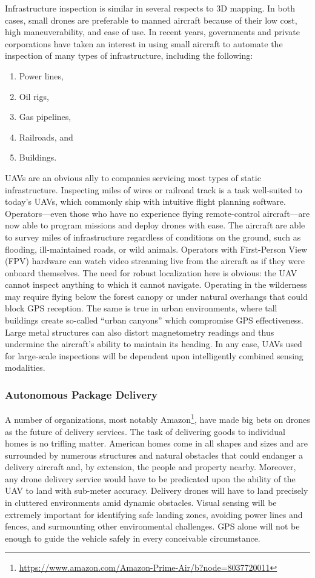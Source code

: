Infrastructure inspection is similar in several respects to 3D mapping. In both cases, small drones are preferable to manned aircraft because of their low cost, high maneuverability, and ease of use. In recent years, governments and private corporations have taken an interest in using small aircraft to automate the inspection of many types of infrastructure, including the following:
\begin{enumerate}
    \item Power lines,
    \item Oil rigs,
    \item Gas pipelines,
    \item Railroads, and
    \item Buildings.
\end{enumerate}
UAVs are an obvious ally to companies servicing most types of static infrastructure. Inspecting miles of wires or railroad track is a task well-suited to today's UAVs, which commonly ship with intuitive flight planning software. Operators---even those who have no experience flying remote-control aircraft---are now able to program missions and deploy drones with ease. The aircraft are able to survey miles of infrastructure regardless of conditions on the ground, such as flooding, ill-maintained roads, or wild animals. Operators with First-Person View (FPV) hardware can watch video streaming live from the aircraft as if they were onboard themselves. The need for robust localization here is obvious: the UAV cannot inspect anything to which it cannot navigate. Operating in the wilderness may require flying below the forest canopy or under natural overhangs that could block GPS reception. The same is true in urban environments, where tall buildings create so-called ``urban canyons'' which compromise GPS effectiveness. Large metal structures can also distort magnetometry readings and thus undermine the aircraft's ability to maintain its heading. In any case, UAVs used for large-scale inspections will be dependent upon intelligently combined sensing modalities.

\subsubsection{Autonomous Package Delivery}

A number of organizations, most notably Amazon\footnote{\url{https://www.amazon.com/Amazon-Prime-Air/b?node=8037720011}}, have made big bets on drones as the future of delivery services. The task of delivering goods to individual homes is no trifling matter. American homes come in all shapes and sizes and are surrounded by numerous structures and natural obstacles that could endanger a delivery aircraft and, by extension, the people and property nearby. Moreover, any drone delivery service would have to be predicated upon the ability of the UAV to land with sub-meter accuracy. Delivery drones will have to land precisely in cluttered environments amid dynamic obstacles. Visual sensing will be extremely important for identifying safe landing zones, avoiding power lines and fences, and surmounting other environmental challenges. GPS alone will not be enough to guide the vehicle safely in every conceivable circumstance. 


